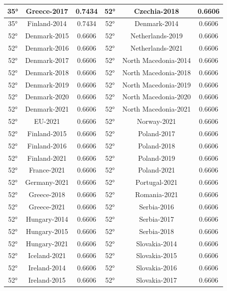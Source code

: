 \documentclass[a4paper,12pt, openright]{report}
\begin{document}
\begin{longtable}[c]{|c|c|c|c|c|c|}
    35° & Greece-2017 & 0.7434 & 52° & Czechia-2018 & 0.6606\\
    \hline
    35° & Finland-2014	& 0.7434 & 52°	& Denmark-2014  & 0.6606\\
    \hline
    52° & Denmark-2015 & 0.6606 & 52° & Netherlands-2019 & 0.6606 \\
    \hline
    52° & Denmark-2016 & 0.6606 & 52° & Netherlands-2021  & 0.6606 \\
    \hline
    52° & Denmark-2017 & 0.6606 & 52° & North Macedonia-2014 & 0.6606\\
    \hline
    52° & Denmark-2018 & 0.6606 & 52° & North Macedonia-2018 & 0.6606 \\
    \hline
    52° & Denmark-2019 & 0.6606 & 52° & North Macedonia-2019 & 0.6606\\
    \hline
    52° & Denmark-2020  & 0.6606 & 52° & North Macedonia-2020 & 0.6606 \\
    \hline
    52° & Denmark-2021 & 0.6606 & 52° & North Macedonia-2021 & 0.6606 \\
    \hline
    52° & EU-2021 & 0.6606  & 52° & Norway-2021  & 0.6606 \\
    \hline
    52° & Finland-2015 & 0.6606  & 52° & Poland-2017 & 0.6606\\
    \hline
    52° & Finland-2016 & 0.6606 & 52° & Poland-2018 & 0.6606 \\
    \hline
    52° & Finland-2021 & 0.6606 & 52° & Poland-2019 & 0.6606\\
    \hline
    52° & France-2021  & 0.6606 & 52° & Poland-2021 & 0.6606 \\
    \hline
    52° & Germany-2021 & 0.6606 & 52° & Portugal-2021 & 0.6606\\
    \hline
    52° & Greece-2018 & 0.6606 & 52° & Romania-2021  & 0.6606 \\
    \hline
    52° & Greece-2021 & 0.6606 & 52° & Serbia-2016 & 0.6606\\
    \hline
    52° & Hungary-2014 & 0.6606 & 52° & Serbia-2017 & 0.6606 \\
    \hline
    52° & Hungary-2015 & 0.6606 & 52° & Serbia-2018 & 0.6606 \\
    \hline
    52° & Hungary-2021  & 0.6606 & 52° & Slovakia-2014 & 0.6606 \\
    \hline
    52° & Iceland-2021 & 0.6606 & 52° & Slovakia-2015 & 0.6606\\
    \hline
    52° & Ireland-2014 & 0.6606 & 52° & Slovakia-2016  & 0.6606 \\
    \hline
    52° & Ireland-2015 & 0.6606 & 52° & Slovakia-2017 & 0.6606 \\

\end{longtable}
\end{document}
